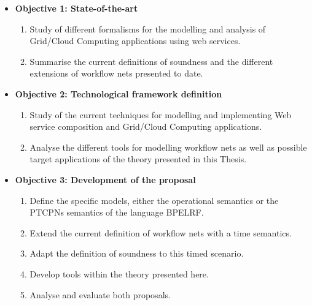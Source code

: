 \begin{itemize}

\item \textbf {Objective 1: State-of-the-art}

\begin{enumerate}

\item Study of different formalisms for the modelling and analysis of Grid/Cloud Computing applications using web services.

\item Summarise the current definitions of soundness and the different extensions of workflow nets presented to date.

\end{enumerate}

\item \textbf{Objective 2: Technological framework definition}

\begin{enumerate}

\item Study of the current techniques for modelling and implementing Web service composition and Grid/Cloud Computing applications.

\item Analyse the different tools for modelling workflow nets as well as possible target applications of the theory presented in this Thesis.
\end{enumerate}

\item \textbf{Objective 3: Development of the proposal}

\begin{enumerate}

\item Define the specific models, either the operational semantics or the PTCPNs semantics of the language BPELRF.

\item Extend the current definition of workflow nets with a time semantics.

\item Adapt the definition of soundness to this timed scenario.

\item Develop tools within the theory presented here.

\item Analyse and evaluate both proposals.

\end{enumerate}


\end{itemize}
